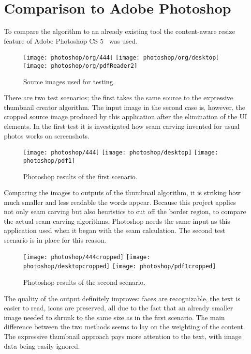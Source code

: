 \documentclass[draft,final]{vutinfth} %
\begin{document}
	\section{Comparison to Adobe Photoshop} 
	To compare the algorithm to an already existing tool the content-aware resize feature of Adobe Photoshop CS 5~\cite{photoshop} was used.
	\begin{figure}[H]
		\texttt{[image: photoshop/org/444]}\hfill
		\texttt{[image: photoshop/org/desktop]}\hfill
		\texttt{[image: photoshop/org/pdfReader2]}
		\caption{Source images used for testing.}
	\end{figure}
	There are two test scenarios; the first takes the same source to the expressive thumbnail creator algorithm.
	The input image in the second case is, however, the cropped source image produced by this application after the elimination of the UI elements.
	In the first test it is investigated how seam carving invented for usual photos works on screenshots.
	\begin{figure}[H]
		\texttt{[image: photoshop/444]}\hfill
		\texttt{[image: photoshop/desktop]}\hfill
		\texttt{[image: photoshop/pdf1]}
		\caption{Photoshop results of the first scenario.}
	\end{figure}
	Comparing  the images to outputs of the thumbnail algorithm, it is striking how much smaller and less readable the words appear.
	Because this project applies not only seam carving but also heuristics to cut off the border region, to compare the actual seam carving algorithms, Photoshop  needs the same input as this application used when it began with the seam calculation.
	The second test scenario is in place for this reason.
	\begin{figure}[H]
		\texttt{[image: photoshop/444cropped]}\hfill
		\texttt{[image: photoshop/desktopcropped]}\hfill
		\texttt{[image: photoshop/pdf1cropped]}
		\caption{Photoshop results of the second scenario.}
	\end{figure}
	The quality of the  output definitely improves: faces are recognizable, the text is easier to read, icons are preserved, all due to the fact that an already smaller image needed to shrunk to the same size as in the first scenario. 
	The main difference between the two methods seems to lay on the weighting of the content.
	The expressive thumbnail approach pays more attention to the text, with image data being easily ignored.
\end{document}
